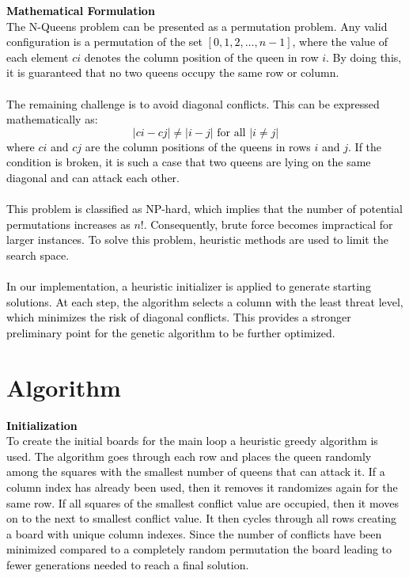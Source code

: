 \documentclass{scrartcl}
\begin{document}
\textcolor{black}{\textbf{Mathematical Formulation \\} The N-Queens problem can be presented as a permutation problem. Any valid configuration is a permutation of the set $[0,1,2,\dots,n-1]$, where the value of each element $ci$ denotes the column position of the queen in row $i$. By doing this, it is guaranteed that no two queens occupy the same row or column. \\ \\ The remaining challenge is to avoid diagonal conflicts. This can be expressed mathematically as: \\ \[ |c i - c j| \neq |i - j| \text{ for all } |i \neq j| \] where $ci$ and $cj$ are the column positions of the queens in rows $i$ and $j$. If the condition is broken, it is such a case that two queens are lying on the same diagonal and can attack each other. \\ \\ This problem is classified as NP-hard, which implies that the number of potential permutations increases as $n!$. Consequently, brute force becomes impractical for larger instances. To solve this problem, heuristic methods are used to limit the search space. \\ \\ In our implementation, a heuristic initializer is applied to generate starting solutions. At each step, the algorithm selects a column with the least threat level, which minimizes the risk of diagonal conflicts. This provides a stronger preliminary point for the genetic algorithm to be further optimized. }

\section{Algorithm}
\label{sec:algorithm}

\textcolor{black}{\textbf{Initialization \\} To create the initial boards for the main loop a heuristic greedy algorithm is used. The algorithm goes through each row and places the queen randomly among the squares with the smallest number of queens that can attack it. If a column index has already been used, then it removes it randomizes again for the same row. If all squares of the smallest conflict value are occupied, then it moves on to the next to smallest conflict value. It then cycles through all rows creating a board with unique column indexes. Since the number of conflicts have been minimized compared to a completely random permutation the board leading to fewer generations needed to reach a final solution.}
\end{document}
